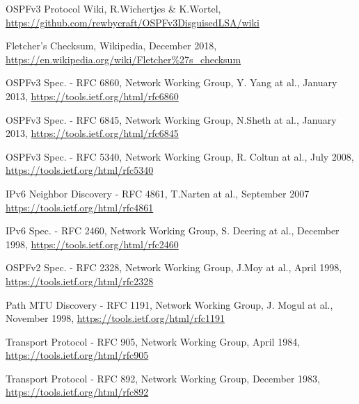 \documentclass[11pt,a4paper,oneside]{article}
\begin{document}
		
    \begin{thebibliography}{999}

        OSPFv3 Protocol Wiki,
        R.Wichertjes \& K.Wortel,
        \url{https://github.com/rewbycraft/OSPFv3DisguisedLSA/wiki}

        Fletcher's Checksum,
        Wikipedia,
        December 2018,
        \url{https://en.wikipedia.org/wiki/Fletcher\%27s_checksum}


        OSPFv3 Spec. - RFC 6860,
        Network Working Group,
        Y. Yang at al.,
        January 2013,
        \url{https://tools.ietf.org/html/rfc6860}

        OSPFv3 Spec. - RFC 6845,
        Network Working Group,
        N.Sheth at al.,
        January 2013,
        \url{https://tools.ietf.org/html/rfc6845}

        OSPFv3 Spec. - RFC 5340,
        Network Working Group,
        R. Coltun at al.,
        July 2008,
        \url{https://tools.ietf.org/html/rfc5340}
        
        IPv6 Neighbor Discovery - RFC 4861,
        T.Narten at al.,
        September 2007
        \url{https://tools.ietf.org/html/rfc4861}

        IPv6 Spec. - RFC 2460,
        Network Working Group,
        S. Deering at al.,
        December 1998,
        \url{https://tools.ietf.org/html/rfc2460}

        OSPFv2 Spec. - RFC 2328,
        Network Working Group,
        J.Moy at al.,
        April 1998,
        \url{https://tools.ietf.org/html/rfc2328}

        Path MTU Discovery - RFC 1191,
        Network Working Group,
        J. Mogul at al.,
        November 1998,
        \url{https://tools.ietf.org/html/rfc1191}

        Transport Protocol - RFC 905,
        Network Working Group,
        April 1984,
        \url{https://tools.ietf.org/html/rfc905}

        Transport Protocol - RFC 892,
        Network Working Group,
        December 1983,
        \url{https://tools.ietf.org/html/rfc892}

    \end{thebibliography}
\end{document}
